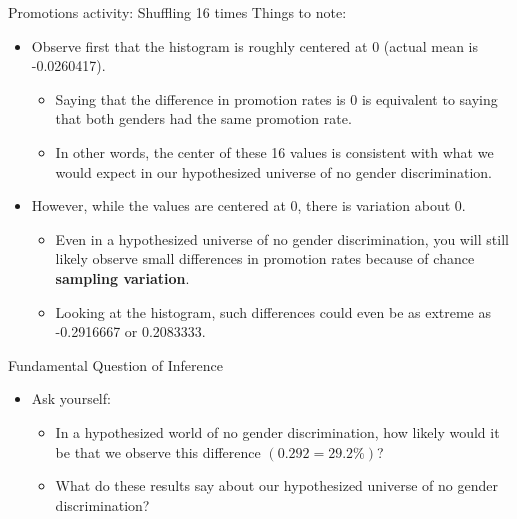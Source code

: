 \documentclass[
  ignorenonframetext,
]{beamer}
\providecommand{\tightlist}{%
  \setlength{\itemsep}{0pt}\setlength{\parskip}{0pt}}
\begin{document}
\begin{frame}{Promotions activity: Shuffling 16 times}
\protect\hypertarget{promotions-activity-shuffling-16-times-1}{}
Things to note:

\begin{itemize}
\item
  Observe first that the histogram is roughly centered at 0 (actual mean
  is -0.0260417).

  \begin{itemize}
  \tightlist
  \item
    Saying that the difference in promotion rates is 0 is equivalent to
    saying that both genders had the same promotion rate.
  \item
    In other words, the center of these 16 values is consistent with
    what we would expect in our hypothesized universe of no gender
    discrimination.
  \end{itemize}
\item
  However, while the values are centered at 0, there is variation about
  0.

  \begin{itemize}
  \tightlist
  \item
    Even in a hypothesized universe of no gender discrimination, you
    will still likely observe small differences in promotion rates
    because of chance \textbf{sampling variation}.
  \item
    Looking at the histogram, such differences could even be as extreme
    as -0.2916667 or 0.2083333.
  \end{itemize}
\end{itemize}
\end{frame}

\begin{frame}{Fundamental Question of Inference}
\protect\hypertarget{fundamental-question-of-inference-1}{}
\begin{itemize}
\item
  Ask yourself:

  \begin{itemize}
  \item
    In a hypothesized world of no gender discrimination, how likely
    would it be that we observe this difference \((0.292 = 29.2\%)\)?
  \item
    What do these results say about our hypothesized universe of no
    gender discrimination?
  \end{itemize}
\end{itemize}
\end{frame}
\end{document}
